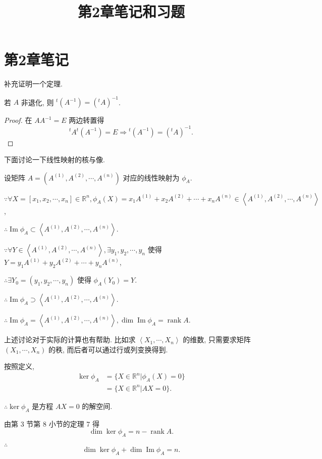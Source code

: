 \documentclass{ctexart}
\title{第2章笔记和习题}
\begin{document}
\maketitle
\section{第2章笔记}
补充证明一个定理.
\begin{theorem}
    若 $A$ 非退化, 则 ${}^t(A^{-1})=({}^tA)^{-1}$.
\end{theorem}
\begin{proof}
    在 $AA^{-1}=E$ 两边转置得
    \[{}^tA{}^t(A^{-1})=E\Rightarrow{}^t(A^{-1})=({}^tA)^{-1}.\]
\end{proof}

下面讨论一下线性映射的核与像.

设矩阵 $A=(A^{(1)},A^{(2)},\cdots,A^{(n)})$ 对应的线性映射为 $\phi_A$.

$\because\forall X=[x_1,x_2,\cdots,x_n]\in\mathbb{R}^n,\phi_A(X)=x_1A^{(1)}+x_2A^{(2)}+\cdots+x_nA^{(n)}\in\left<A^{(1)},A^{(2)},\cdots,A^{(n)}\right>$,

$\therefore\operatorname{Im}\phi_A\subset\left<A^{(1)},A^{(2)},\cdots,A^{(n)}\right>$.

$\because\forall Y\in\left<A^{(1)},A^{(2)},\cdots,A^{(n)}\right>,\exists y_1,y_2,\cdots,y_n$ 使得 $Y=y_1A^{(1)}+y_2A^{(2)}+\cdots+y_nA^{(n)}$,

$\therefore\exists Y_0=(y_1,y_2,\cdots,y_n)$ 使得 $\phi_A(Y_0)=Y$.

$\therefore\operatorname{Im}\phi_A\supset\left<A^{(1)},A^{(2)},\cdots,A^{(n)}\right>$.

$\therefore\operatorname{Im}\phi_A=\left<A^{(1)},A^{(2)},\cdots,A^{(n)}\right>,\dim\operatorname{Im}\phi_A=\operatorname{rank}A$.

上述讨论对于实际的计算也有帮助. 比如求 $\left<X_1,\cdots,X_n\right>$ 的维数, 只需要求矩阵 $(X_1,\cdots,X_n)$ 的秩, 而后者可以通过行或列变换得到.

按照定义,
\begin{align*}
    \ker\phi_A & =\{X\in\mathbb{R}^n|\phi_A(X)=0\} \\
    & =\{X\in\mathbb{R}^n|AX=0\}.
\end{align*}

$\therefore\ker\phi_A$ 是方程 $AX=0$ 的解空间.

由第 3 节第 8 小节的定理 7 得
\[\dim\ker\phi_A=n-\operatorname{rank}A.\]

$\therefore$
\[\dim\ker\phi_A+\dim\operatorname{Im}\phi_A=n.\]
\end{document}
